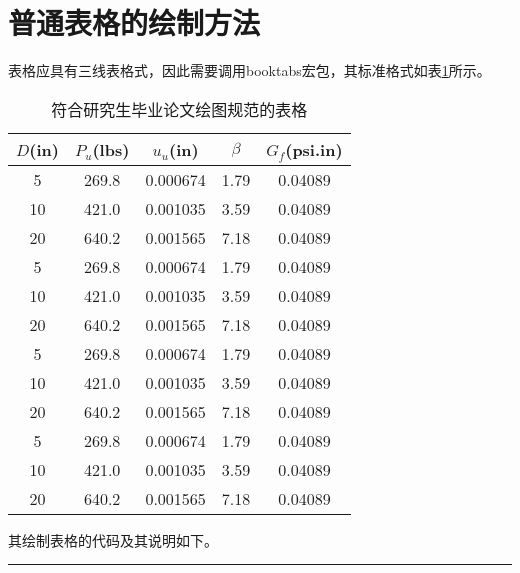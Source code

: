 \section{普通表格的绘制方法}
表格应具有三线表格式，因此需要调用booktabs宏包，其标准格式如表\ref{tab:table1}所示。
\begin{table}[htbp]
	\caption{符合研究生毕业论文绘图规范的表格}\label{tab:table1}
	\vspace{0.5em}\centering{}
	\begin{tabular}{ccccc}
		\toprule[1.5pt]
		$D$(in) & $P_u$(lbs) & $u_u$(in) & $\beta$ & $G_f$(psi.in) \\
		\midrule[1pt]
		5       & 269.8      & 0.000674  & 1.79    & 0.04089       \\
		10      & 421.0      & 0.001035  & 3.59    & 0.04089       \\
		20      & 640.2      & 0.001565  & 7.18    & 0.04089       \\
		5       & 269.8      & 0.000674  & 1.79    & 0.04089       \\
		10      & 421.0      & 0.001035  & 3.59    & 0.04089       \\
		20      & 640.2      & 0.001565  & 7.18    & 0.04089       \\
		5       & 269.8      & 0.000674  & 1.79    & 0.04089       \\
		10      & 421.0      & 0.001035  & 3.59    & 0.04089       \\
		20      & 640.2      & 0.001565  & 7.18    & 0.04089       \\
		5       & 269.8      & 0.000674  & 1.79    & 0.04089       \\
		10      & 421.0      & 0.001035  & 3.59    & 0.04089       \\
		20      & 640.2      & 0.001565  & 7.18    & 0.04089       \\
		\bottomrule[1.5pt]
	\end{tabular}
	\vspace{\baselineskip}
\end{table}

其绘制表格的代码及其说明如下。
\vspace{2em}\noindent\hrule

